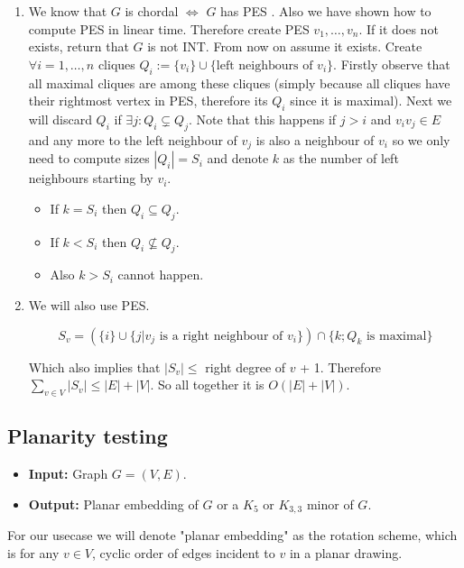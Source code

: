 \begin{enumerate}
	\item We know that $G$ is chordal $\iff$ $G$ has PES \PES. Also we have shown how to compute PES in linear time. Therefore create PES $v_{1}, \dots, v_{n}$. If it does not exists, return that $G$ is not INT. From now on assume it exists. Create $\forall i = 1, \dots, n$ cliques $Q_{i} := \{v_{i}\} \cup \{\text{left neighbours of } v_{i}\}$. Firstly observe that all maximal cliques are among these cliques (simply because all cliques have their rightmost vertex in PES, therefore its $Q_{i}$ since it is maximal). Next we will discard $Q_{i}$  if $\exists j : Q_{i} \subsetneq Q_{j}$. Note that this happens if $j > i$ and $v_{i}v_{j} \in E$ and any more to the left neighbour of $v_{j}$ is also a neighbour of $v_{i}$ so we only need to compute sizes $|Q_{i}| = S_{i}$ and denote $k$ as the number of left neighbours starting by $v_{i}$.
		\begin{itemize}
			\item If $k = S_{i}$ then $Q_{i} \subseteq Q_{j}$.
			\item If $k < S_{i}$ then $Q_{i} \nsubseteq Q_{j}$.
			\item Also $k > S_{i}$ cannot happen.
		\end{itemize}

	\item We will also use PES.

	$$
	S_{v} = (\{i\} \cup \{j | v_{j} \text{ is a right neighbour of } v_{i}\}) \cap \{k; Q_{k} \text{ is maximal}\}
	$$

	Which also implies that $|S_{v}| \leq$ right degree of $v$ + 1. Therefore $\sum_{v \in V} |S_{v}| \leq |E| + |V|$. So all together it is $O(|E| + |V|)$.
\end{enumerate}

\subsection{Planarity testing}

\begin{itemize}[]
	\item \textbf{Input:} Graph $G = (V,E)$.
	\item \textbf{Output:} Planar embedding of $G$ or a $K_{5}$ or $K_{3,3}$ minor of $G$.
\end{itemize}

For our usecase we will denote "planar embedding" as the rotation scheme, which is for any $v \in V$, cyclic order of edges incident to $v$ in a planar drawing.

